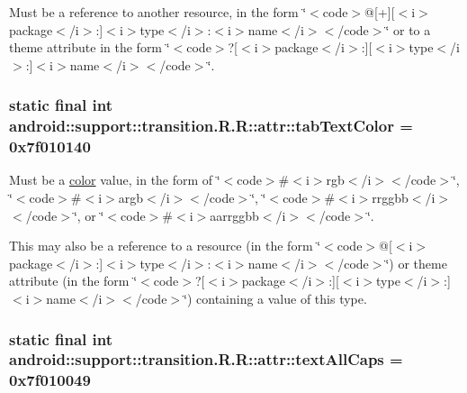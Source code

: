 Must be a reference to another resource, in the form \char`\"{}$<$code$>$@\mbox{[}+\mbox{]}\mbox{[}$<$i$>$package$<$/i$>$:\mbox{]}$<$i$>$type$<$/i$>$:$<$i$>$name$<$/i$>$$<$/code$>$\char`\"{} or to a theme attribute in the form \char`\"{}$<$code$>$?\mbox{[}$<$i$>$package$<$/i$>$:\mbox{]}\mbox{[}$<$i$>$type$<$/i$>$:\mbox{]}$<$i$>$name$<$/i$>$$<$/code$>$\char`\"{}. \hypertarget{classandroid_1_1support_1_1transition_1_1_r_1_1attr_53c50c610f86ee46f81fe38794fb9e79}{
\subsubsection[{tabTextColor}]{\setlength{\rightskip}{0pt plus 5cm}static final int android::support::transition.R.R::attr::tabTextColor = 0x7f010140}}
\label{classandroid_1_1support_1_1transition_1_1_r_1_1attr_53c50c610f86ee46f81fe38794fb9e79}


Must be a \hyperlink{classandroid_1_1support_1_1transition_1_1_r_1_1color}{color} value, in the form of \char`\"{}$<$code$>$\#$<$i$>$rgb$<$/i$>$$<$/code$>$\char`\"{}, \char`\"{}$<$code$>$\#$<$i$>$argb$<$/i$>$$<$/code$>$\char`\"{}, \char`\"{}$<$code$>$\#$<$i$>$rrggbb$<$/i$>$$<$/code$>$\char`\"{}, or \char`\"{}$<$code$>$\#$<$i$>$aarrggbb$<$/i$>$$<$/code$>$\char`\"{}. 

This may also be a reference to a resource (in the form \char`\"{}$<$code$>$@\mbox{[}$<$i$>$package$<$/i$>$:\mbox{]}$<$i$>$type$<$/i$>$:$<$i$>$name$<$/i$>$$<$/code$>$\char`\"{}) or theme attribute (in the form \char`\"{}$<$code$>$?\mbox{[}$<$i$>$package$<$/i$>$:\mbox{]}\mbox{[}$<$i$>$type$<$/i$>$:\mbox{]}$<$i$>$name$<$/i$>$$<$/code$>$\char`\"{}) containing a value of this type. \hypertarget{classandroid_1_1support_1_1transition_1_1_r_1_1attr_07d283da21b839fa58d86449d226d77f}{
\subsubsection[{textAllCaps}]{\setlength{\rightskip}{0pt plus 5cm}static final int android::support::transition.R.R::attr::textAllCaps = 0x7f010049}}
\label{classandroid_1_1support_1_1transition_1_1_r_1_1attr_07d283da21b839fa58d86449d226d77f}


